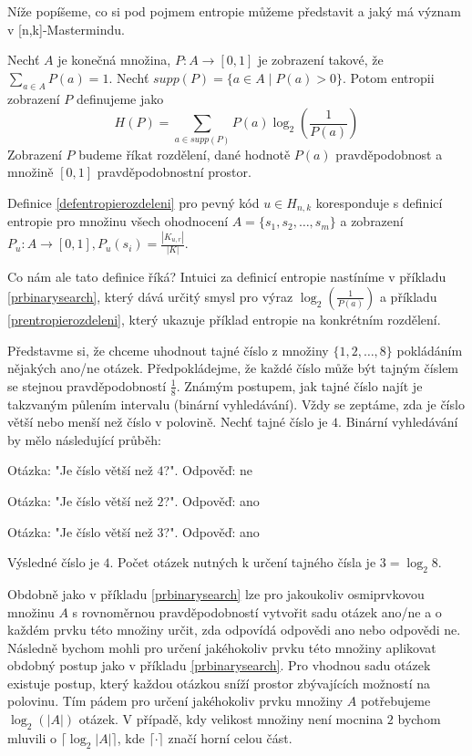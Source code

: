 Níže popíšeme, co si pod pojmem entropie můžeme představit a jaký má význam v [n,k]-Mastermindu.

\begin{definice}[Entropie]\label{defentropie}
  Nechť $A$ je konečná množina, $P \colon A \to [0,1]$ je zobrazení takové, že $\sum_{a \in A} P(a) = 1$. Nechť $supp(P) = \{ a \in A \mid P(a) > 0\}$. Potom entropii zobrazení $P$ definujeme jako 
  \[H(P) = \sum_{a \in supp(P)}P(a)\log_2\left(\frac{1}{P(a)}\right)\]
  Zobrazení $P$ budeme říkat rozdělení, dané hodnotě $P(a)$ pravděpodobnost a množině $[0,1]$ pravděpodobnostní prostor. 
\end{definice}

\begin{pozn}
    Definice \ref{defentropierozdeleni} pro pevný kód $u\in H_{n,k}$ koresponduje s definicí entropie pro množinu všech ohodnocení $A = \{s_1, s_2, \dots, s_m \}$ a zobrazení $P_u\colon A \to [0,1], P_u(s_i) = \frac{|K_{u,r}|}{|K|}$.
\end{pozn}

Co nám ale tato definice říká? Intuici za definicí entropie nastíníme v příkladu \ref{prbinarysearch}, který dává určitý smysl pro výraz $\log_2\left(\frac{1}{P(a)}\right)$ a příkladu \ref{prentropierozdeleni}, který ukazuje příklad entropie na konkrétním rozdělení.

\begin{prikl}\label{prbinarysearch}
Představme si, že chceme uhodnout tajné číslo z množiny $\{1,2,\dots,8\}$ pokládáním nějakých ano/ne otázek. Předpokládejme, že každé číslo může být tajným číslem se stejnou pravděpodobností $\frac{1}{8}$. Známým postupem, jak tajné číslo najít je takzvaným půlením intervalu (binární vyhledávání). Vždy se zeptáme, zda je číslo větší nebo menší než číslo v polovině. Nechť tajné číslo je $4$. Binární vyhledávání by mělo následující průběh:

Otázka: "Je číslo větší než $4$?". 
Odpověď: ne

Otázka: "Je číslo větší než $2$?". 
Odpověď: ano

Otázka: "Je číslo větší než $3$?". 
Odpověď: ano

Výsledné číslo je $4$. Počet otázek nutných k určení tajného čísla je $3 = \log_2 8$.
\end{prikl}

\begin{pozn}\label{poznotazkynamnozinu}
Obdobně jako v příkladu \ref{prbinarysearch} lze pro jakoukoliv osmiprvkovou množinu $A$ s rovnoměrnou pravděpodobností vytvořit sadu otázek ano/ne a o každém prvku této množiny určit, zda odpovídá odpovědi ano nebo odpovědi ne. Následně bychom mohli pro určení jakéhokoliv prvku této množiny aplikovat obdobný postup jako v příkladu \ref{prbinarysearch}. Pro vhodnou sadu otázek existuje postup, který každou otázkou sníží prostor zbývajících možností na polovinu. Tím pádem pro určení jakéhokoliv prvku množiny $A$ potřebujeme $\log_2(|A|)$ otázek. V případě, kdy velikost množiny není mocnina $2$ bychom mluvili o $\lceil \log_2 |A| \rceil$, kde $\lceil \cdot \rceil$ značí horní celou část. 
\end{pozn}

